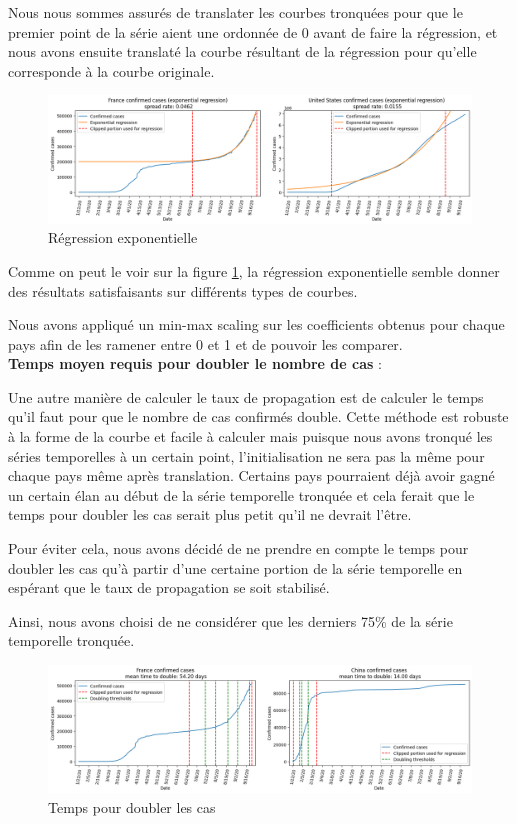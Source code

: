 \documentclass[12pt]{iEEEtran}
\begin{document}
Nous nous sommes assurés de translater les courbes tronquées pour que le premier point de la série
aient une ordonnée de 0 avant de faire la régression, et nous avons ensuite translaté la courbe
résultant de la régression pour qu'elle corresponde à la courbe originale.

\begin{figure}[h]
    \centering
    \includegraphics[width=\columnwidth]{img/exp_reg.png}
    \caption{Régression exponentielle}

    \label{fig:exp_reg}
\end{figure}

Comme on peut le voir sur la figure \ref{fig:exp_reg}, la régression exponentielle semble donner
des résultats satisfaisants sur différents types de courbes.

Nous avons appliqué un min-max scaling sur les coefficients obtenus pour chaque pays afin de les
ramener entre 0 et 1 et de pouvoir les comparer.
\\

\noindent\textbf{Temps moyen requis pour doubler le nombre de cas} :

Une autre manière de calculer le taux de propagation est de calculer le temps qu'il faut pour que le nombre
de cas confirmés double. Cette méthode est robuste à la forme de la courbe et facile à calculer mais puisque
nous avons tronqué les séries temporelles à un certain point, l'initialisation ne sera pas la même pour chaque
pays même après translation. Certains pays pourraient déjà avoir gagné un certain élan au début de la série
temporelle tronquée et cela ferait que le temps pour doubler les cas serait plus petit qu'il ne devrait l'être.

Pour éviter cela, nous avons décidé de ne prendre en compte le temps pour doubler les cas qu'à partir
d'une certaine portion de la série temporelle en espérant que le taux de propagation se soit stabilisé.

Ainsi, nous avons choisi de ne considérer que les derniers 75\% de la série temporelle tronquée.

\begin{figure}[h]
    \centering
    \includegraphics[width=\columnwidth]{img/time_double.png}
    \caption{Temps pour doubler les cas}

    \label{fig:time_double}
\end{figure}
\end{document}
